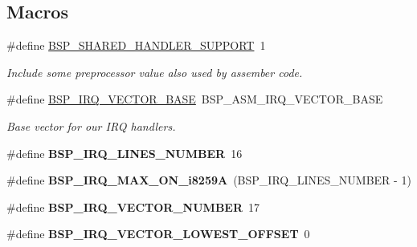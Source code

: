 \subsection*{Macros}
\begin{DoxyCompactItemize}
\item 
\mbox{\label{group__i386__irq_ga2fe5e739729e5756a04cc73da64cc8ee}} 
\#define \mbox{\hyperlink{group__i386__irq_ga2fe5e739729e5756a04cc73da64cc8ee}{B\+S\+P\+\_\+\+S\+H\+A\+R\+E\+D\+\_\+\+H\+A\+N\+D\+L\+E\+R\+\_\+\+S\+U\+P\+P\+O\+RT}}~1
\begin{DoxyCompactList}\small\item\em Include some preprocessor value also used by assember code. \end{DoxyCompactList}\item 
\mbox{\label{group__i386__irq_ga942062c30f3cc4be854047a61430cc31}} 
\#define \mbox{\hyperlink{group__i386__irq_ga942062c30f3cc4be854047a61430cc31}{B\+S\+P\+\_\+\+I\+R\+Q\+\_\+\+V\+E\+C\+T\+O\+R\+\_\+\+B\+A\+SE}}~B\+S\+P\+\_\+\+A\+S\+M\+\_\+\+I\+R\+Q\+\_\+\+V\+E\+C\+T\+O\+R\+\_\+\+B\+A\+SE
\begin{DoxyCompactList}\small\item\em Base vector for our I\+RQ handlers. \end{DoxyCompactList}\item 
\mbox{\label{group__i386__irq_ga5f59ae8121b39ac803bb26e804104f4a}} 
\#define {\bfseries B\+S\+P\+\_\+\+I\+R\+Q\+\_\+\+L\+I\+N\+E\+S\+\_\+\+N\+U\+M\+B\+ER}~16
\item 
\mbox{\label{group__i386__irq_ga0c96f32ca5dc09b16dd3c4cac161e93d}} 
\#define {\bfseries B\+S\+P\+\_\+\+I\+R\+Q\+\_\+\+M\+A\+X\+\_\+\+O\+N\+\_\+i8259A}~(B\+S\+P\+\_\+\+I\+R\+Q\+\_\+\+L\+I\+N\+E\+S\+\_\+\+N\+U\+M\+B\+ER -\/ 1)
\item 
\mbox{\label{group__i386__irq_gae11237209615a14b12e0c16f5a24fc48}} 
\#define {\bfseries B\+S\+P\+\_\+\+I\+R\+Q\+\_\+\+V\+E\+C\+T\+O\+R\+\_\+\+N\+U\+M\+B\+ER}~17
\item 
\mbox{\label{group__i386__irq_ga6c4c9bfcb18b041288e27f5b5b614421}} 
\#define {\bfseries B\+S\+P\+\_\+\+I\+R\+Q\+\_\+\+V\+E\+C\+T\+O\+R\+\_\+\+L\+O\+W\+E\+S\+T\+\_\+\+O\+F\+F\+S\+ET}~0

\end{DoxyCompactItemize}
